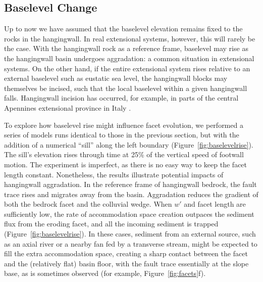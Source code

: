 \subsection{Baselevel Change}

Up to now we have assumed that the baselevel elevation remains fixed to the rocks in the hangingwall. In real extensional systems, however, this will rarely be the case. With the hangingwall rock as a reference frame, baselevel may rise as the hangingwall basin undergoes aggradation: a common situation in extensional systems. On the other hand, if the entire extensional system rises relative to an external baselevel such as eustatic sea level, the hangingwall blocks may themselves be incised, such that the local baselevel within a given hangingwall falls. Hangingwall incision has occurred, for example, in parts of the central Apennines extensional province in Italy \citep[e.g.,][]{dagostino2003interactions}.

To explore how baselevel rise might influence facet evolution, we performed a series of models runs identical to those in the previous section, but with the addition of a numerical ``sill'' along the left boundary (Figure~\ref{fig:baselevelrise}). The sill's elevation rises through time at 25\% of the vertical speed of footwall motion. The experiment is imperfect, as there is no easy way to keep the facet length constant. Nonetheless, the results illustrate potential impacts of hangingwall aggradation. In the reference frame of hangingwall bedrock, the fault trace rises and migrates away from the basin. Aggradation reduces the gradient of both the bedrock facet and the colluvial wedge. When $w'$ and facet length are sufficiently low, the rate of accommodation space creation outpaces the sediment flux from the eroding facet, and all the incoming sediment is trapped (Figure~\ref{fig:baselevelrise}). In these cases, sediment from an external source, such as an axial river or a nearby fan fed by a transverse stream, might be expected to fill the extra accommodation space, creating a sharp contact between the facet and the (relatively flat) basin floor, with the fault trace essentially at the slope base, as is sometimes observed (for example, Figure~\ref{fig:facets}f). 


